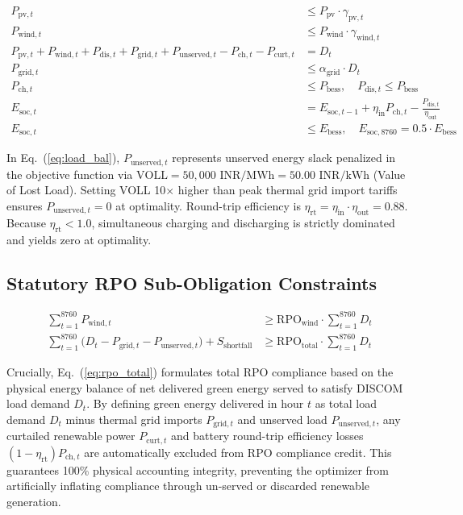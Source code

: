 \documentclass[11pt,a4paper]{article}
\begin{document}
\begin{align}
P_{\text{pv},t} &\le P_{\text{pv}} \cdot \gamma_{\text{pv},t} \label{eq:solar_avail} \\
P_{\text{wind},t} &\le P_{\text{wind}} \cdot \gamma_{\text{wind},t} \label{eq:wind_avail} \\
P_{\text{pv},t} + P_{\text{wind},t} + P_{\text{dis},t} + P_{\text{grid},t} + P_{\text{unserved},t} - P_{\text{ch},t} - P_{\text{curt},t} &= D_t \label{eq:load_bal} \\
P_{\text{grid},t} &\le \alpha_{\text{grid}} \cdot D_t \label{eq:grid_limit} \\
P_{\text{ch},t} &\le P_{\text{bess}}, \quad P_{\text{dis},t} \le P_{\text{bess}} \label{eq:bess_pwr} \\
E_{\text{soc},t} &= E_{\text{soc},t-1} + \eta_{\text{in}} P_{\text{ch},t} - \frac{P_{\text{dis},t}}{\eta_{\text{out}}} \label{eq:soc_dyn} \\
E_{\text{soc},t} &\le E_{\text{bess}}, \quad E_{\text{soc},8760} = 0.5 \cdot E_{\text{bess}} \label{eq:soc_bound}
\end{align}

In Eq.~(\ref{eq:load_bal}), $P_{\text{unserved},t}$ represents unserved energy slack penalized in the objective function via $\text{VOLL} = 50,000\text{ INR/MWh} = 50.00\text{ INR/kWh}$ (Value of Lost Load). Setting VOLL 10$\times$ higher than peak thermal grid import tariffs ensures $P_{\text{unserved},t} = 0$ at optimality. Round-trip efficiency is $\eta_{\text{rt}} = \eta_{\text{in}} \cdot \eta_{\text{out}} = 0.88$. Because $\eta_{\text{rt}} < 1.0$, simultaneous charging and discharging is strictly dominated and yields zero at optimality.

\subsection{Statutory RPO Sub-Obligation Constraints}
\label{sec:rpo_const}

\begin{align}
\sum_{t=1}^{8760} P_{\text{wind},t} &\ge \text{RPO}_{\text{wind}} \cdot \sum_{t=1}^{8760} D_t \label{eq:rpo_wind} \\
\sum_{t=1}^{8760} \Big( D_t - P_{\text{grid},t} - P_{\text{unserved},t} \Big) + S_{\text{shortfall}} &\ge \text{RPO}_{\text{total}} \cdot \sum_{t=1}^{8760} D_t \label{eq:rpo_total}
\end{align}

Crucially, Eq.~(\ref{eq:rpo_total}) formulates total RPO compliance based on the physical energy balance of net delivered green energy served to satisfy DISCOM load demand $D_t$. By defining green energy delivered in hour $t$ as total load demand $D_t$ minus thermal grid imports $P_{\text{grid},t}$ and unserved load $P_{\text{unserved},t}$, any curtailed renewable power $P_{\text{curt},t}$ and battery round-trip efficiency losses $(1-\eta_{\text{rt}}) P_{\text{ch},t}$ are automatically excluded from RPO compliance credit. This guarantees 100\% physical accounting integrity, preventing the optimizer from artificially inflating compliance through un-served or discarded renewable generation.
\end{document}
